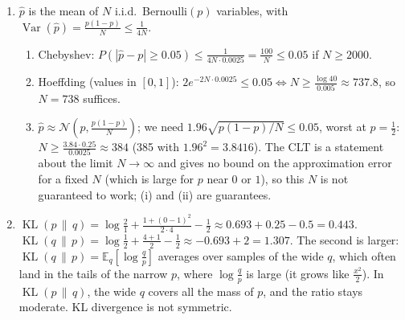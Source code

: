 \documentclass[11pt]{article}
\newcommand{\E}{\mathbb{E}}
\DeclareMathOperator{\Var}{Var}
\DeclareMathOperator{\KL}{KL}
\begin{document}
\begin{enumerate}[label=(\alph*)]
    \item $\hat p$ is the mean of $N$ i.i.d.\ Bernoulli$(p)$ variables, with $\Var(\hat p) = \frac{p(1 - p)}{N} \leq \frac{1}{4N}$.
    \begin{enumerate}[label=(\roman*)]
        \item Chebyshev: $P(|\hat p - p| \geq 0.05) \leq \frac{1}{4N \cdot 0.0025} = \frac{100}{N} \leq 0.05$ if $N \geq 2000$.
        \item Hoeffding (values in $[0, 1]$): $2e^{-2N \cdot 0.0025} \leq 0.05 \iff N \geq \frac{\log 40}{0.005} \approx 737.8$, so $N = 738$ suffices.
        \item $\hat p \approx \mathcal{N}(p, \frac{p(1 - p)}{N})$; we need $1.96\sqrt{p(1 - p)/N} \leq 0.05$, worst at $p = \frac{1}{2}$: $N \geq \frac{3.84 \cdot 0.25}{0.0025} \approx 384$ (385 with $1.96^2 = 3.8416$). The CLT is a statement about the limit $N \to \infty$ and gives no bound on the approximation error for a fixed $N$ (which is large for $p$ near $0$ or $1$), so this $N$ is not guaranteed to work; (i) and (ii) are guarantees.
    \end{enumerate}
    \item $\KL(p \,\|\, q) = \log\frac{2}{1} + \frac{1 + (0 - 1)^2}{2 \cdot 4} - \frac{1}{2} \approx 0.693 + 0.25 - 0.5 = 0.443$. $\KL(q \,\|\, p) = \log\frac{1}{2} + \frac{4 + 1}{2} - \frac{1}{2} \approx -0.693 + 2 = 1.307$. The second is larger: $\KL(q \,\|\, p) = \E_q[\log\frac{q}{p}]$ averages over samples of the wide $q$, which often land in the tails of the narrow $p$, where $\log\frac{q}{p}$ is large (it grows like $\frac{x^2}{2}$). In $\KL(p \,\|\, q)$, the wide $q$ covers all the mass of $p$, and the ratio stays moderate. KL divergence is not symmetric.
\end{enumerate}
\end{document}
